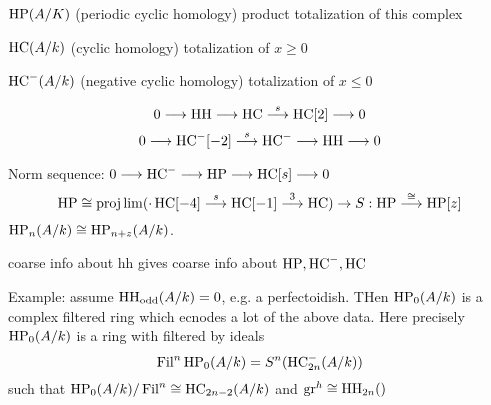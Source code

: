 $\hp(A/K)$ (periodic cyclic homology) product totalization of this complex 

$\hc(A/k)$ (cyclic homology) totalization of $x \geq 0$

$\hc^-(A/k)$ (negative cyclic homology) totalization of $x \leq 0$ 

	\[
	0 \ma{} \hh \ma{} \hc \ma{s} \hc[2] \ma{} 0
	\]
	\[
	0 \ma{} \hc^-[-2] \ma{s} \hc^- \ma{} \hh \ma{} 0
	\]

Norm sequence: $0 \ma{} \hc^- \ma{} \hp \ma{} \hc[s] \ma{} 0$
	\[
	\hp \cong \projlim (\cdot \hc[-4] \ma{s} \hc[-1] \ma{3} \hc) \to S: \hp \ma{\cong} \hp[z]
	\]
$\hp_n(A/k) \cong \hp_{n+z}(A/k)$. 


coarse info about hh gives coarse info about $\hp, \hc^-,\hc$

Example: assume $\hh_\text{odd}(A/k)=0$, e.g. a perfectoidish. THen $\hp_0(A/k)$ is a complex filtered ring which ecnodes a lot of the above data. Here precisely $\hp_0(A/k)$ is a ring with filtered by ideals
	\[
	\fil^n \hp_0(A/k)= S^n(\hc_{2n}^-(A/k))
	\]
such that $\hp_0(A/k)/\fil^n \cong \hc_{2n-2}(A/k)$
and $\text{gr}^h \cong \hh_{2n}()$




















